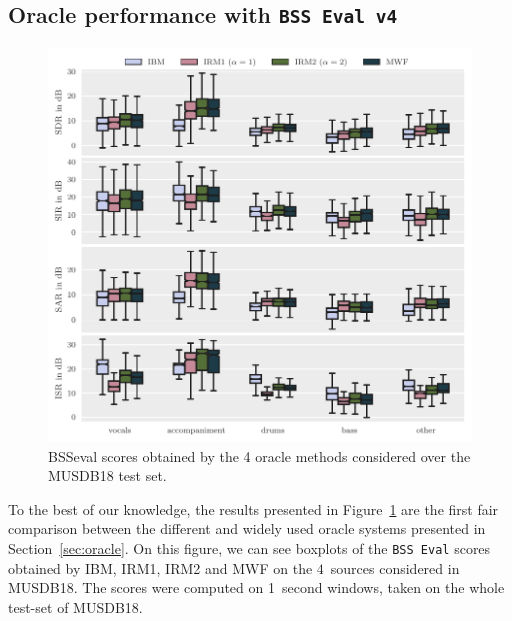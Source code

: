\documentclass{llncs}
\begin{document}
\subsection{Oracle performance with \texttt{BSS Eval v4}}
\label{ssec:bsseval-results}
\begin{figure}[ht]
  \begin{center}
     \includegraphics[width=\linewidth]{fig/oracle-evaluation.pdf}
     \vspace{-1cm}
  \end{center}
  \caption{BSSeval scores obtained by the 4 oracle methods considered over the MUSDB18 test set.}
  \label{fig:oracle_bsseval}
\end{figure}
To the best of our knowledge, the results presented in Figure~\ref{fig:oracle_bsseval} are the first fair comparison between the different and widely used oracle systems presented in Section~\ref{sec:oracle}. On this figure, we can see boxplots of the \texttt{BSS~Eval} scores obtained by IBM, IRM1, IRM2 and MWF on the $4$~sources considered in MUSDB18. The scores were computed on 1~second windows, taken on the whole test-set of MUSDB18.
\end{document}
